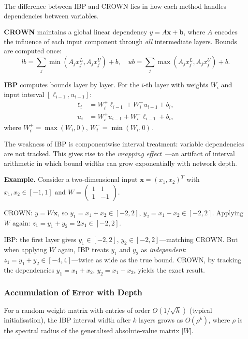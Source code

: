 The difference between IBP and CROWN lies in how each method handles
dependencies between variables.

\textbf{CROWN} maintains a global linear dependency
$y = A \mathbf{x} + \mathbf{b}$, where $A$ encodes the influence of each input
component through \textit{all} intermediate layers. Bounds are computed once:
$$lb = \sum_j \min(A_j x_j^L, A_j x_j^U) + b, \quad
  ub = \sum_j \max(A_j x_j^L, A_j x_j^U) + b.$$

\textbf{IBP} computes bounds layer by layer. For the $i$-th layer with weights
$W_i$ and input interval $[\ell_{i-1}, u_{i-1}]$:
\begin{align*}
\ell_i &= W_i^+ \ell_{i-1} + W_i^- u_{i-1} + b_i, \\
u_i &= W_i^+ u_{i-1} + W_i^- \ell_{i-1} + b_i,
\end{align*}
where $W_i^+ = \max(W_i, 0)$, $W_i^- = \min(W_i, 0)$.

The weakness of IBP is componentwise interval treatment: variable dependencies
are not tracked. This gives rise to the \textit{wrapping effect}~\cite{moore2009interval}---an
artifact of interval arithmetic in which bound widths can grow exponentially
with network depth.

\textbf{Example.} Consider a two-dimensional input
$\mathbf{x} = (x_1, x_2)^T$ with $x_1, x_2 \in [-1, 1]$ and
$W = \begin{pmatrix} 1 & 1 \\ 1 & -1 \end{pmatrix}$.

CROWN: $y = W\mathbf{x}$, so $y_1 = x_1 + x_2 \in [-2, 2]$,
$y_2 = x_1 - x_2 \in [-2, 2]$. Applying $W$ again:
$z_1 = y_1 + y_2 = 2x_1 \in [-2, 2]$.

IBP: the first layer gives $y_1 \in [-2, 2]$, $y_2 \in [-2, 2]$---matching
CROWN. But when applying $W$ again, IBP treats $y_1$ and $y_2$ as
\textit{independent}: $z_1 = y_1 + y_2 \in [-4, 4]$---twice as wide as the
true bound. CROWN, by tracking the dependencies $y_1 = x_1 + x_2$,
$y_2 = x_1 - x_2$, yields the exact result.

\subsubsection{Accumulation of Error with Depth}

For a random weight matrix with entries of order $O(1/\sqrt{h})$ (typical
initialisation), the IBP interval width after $k$ layers grows as $O(\rho^k)$,
where $\rho$ is the spectral radius of the generalised absolute-value matrix $|W|$.

